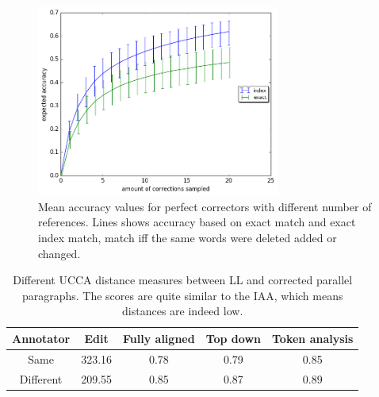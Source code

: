 \documentclass[11pt]{article}
\begin{document}
 \begin{figure}
 	\includegraphics[width=8cm]{repeat_1000_accuracy}
 	\caption{Mean accuracy values for perfect correctors with different number of references. Lines shows accuracy based on exact match and exact index match, match iff the same words were deleted added or changed.} \label{fig:accuracy_vals}
 \end{figure}



\vspace*{-\baselineskip}
\begin{table}[h!]
	\centering
	\singlespacing
	\begin{tabular}{c|c|c|c|c}
		Annotator & Edit & Fully aligned & Top down & Token analysis
		\\
		\hline
		Same& 323.16 & 0.78 & 0.79 & 0.85
		\\
		Different & 209.55 & 0.85 & 0.87 & 0.89
		\\
		\end{tabular}
		\caption{Different UCCA distance measures between LL and corrected parallel paragraphs. The scores are quite similar to the IAA, which means distances are indeed low.\label{tab:Distances}}
	\end{table}
\end{document}
